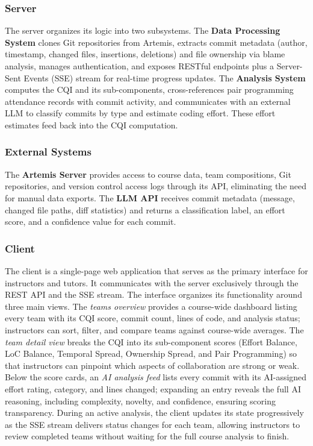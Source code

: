 \documentclass[sigconf]{acmart}
\begin{document}
\subsubsection{Server}

The server organizes its logic into two subsystems. The \textbf{Data Processing System} clones Git repositories from Artemis, extracts commit metadata (author, timestamp, changed files, insertions, deletions) and file ownership via blame analysis, manages authentication, and exposes RESTful endpoints plus a Server-Sent Events (SSE) stream for real-time progress updates. The \textbf{Analysis System} computes the CQI and its sub-components, cross-references pair programming attendance records with commit activity, and communicates with an external LLM to classify commits by type and estimate coding effort. These effort estimates feed back into the CQI computation.

\subsubsection{External Systems}

The \textbf{Artemis Server} provides access to course data, team compositions, Git repositories, and version control access logs through its API, eliminating the need for manual data exports. The \textbf{LLM API} receives commit metadata (message, changed file paths, diff statistics) and returns a classification label, an effort score, and a confidence value for each commit.

\subsubsection{Client}

The client is a single-page web application that serves as the primary interface for instructors and tutors. It communicates with the server exclusively through the REST API and the SSE stream. The interface organizes its functionality around three main views. The \textit{teams overview} provides a course-wide dashboard listing every team with its CQI score, commit count, lines of code, and analysis status; instructors can sort, filter, and compare teams against course-wide averages. The \textit{team detail view} breaks the CQI into its sub-component scores (Effort Balance, LoC Balance, Temporal Spread, Ownership Spread, and Pair Programming) so that instructors can pinpoint which aspects of collaboration are strong or weak. Below the score cards, an \textit{AI analysis feed} lists every commit with its AI-assigned effort rating, category, and lines changed; expanding an entry reveals the full AI reasoning, including complexity, novelty, and confidence, ensuring scoring transparency. During an active analysis, the client updates its state progressively as the SSE stream delivers status changes for each team, allowing instructors to review completed teams without waiting for the full course analysis to finish.
\end{document}
